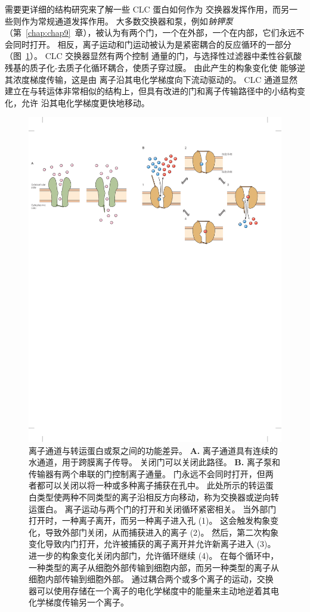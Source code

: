 需要更详细的结构研究来了解一些 CLC 蛋白如何作为  交换器发挥作用，而另一些则作为常规通道发挥作用。
大多数交换器和泵，例如\textit{钠钾泵}（第~\ref{chap:chap9}~章），被认为有两个门，一个在外部，一个在内部，它们永远不会同时打开。
相反，离子运动和门运动被认为是紧密耦合的反应循环的一部分（图~\ref{fig:8_16}）。
CLC 交换器显然有两个控制  通量的门，与选择性过滤器中柔性谷氨酸残基的质子化-去质子化循环耦合，使质子穿过膜。
由此产生的构象变化使  能够逆其浓度梯度传输，这是由  离子沿其电化学梯度向下流动驱动的。
CLC 通道显然建立在与转运体非常相似的结构上，但具有改进的门和离子传输路径中的小结构变化，允许  沿其电化学梯度更快地移动。


\begin{figure}[htbp]
	\centering
	\includegraphics[width=0.85\linewidth]{chap08/fig_8_16}
	\caption{离子通道与转运蛋白或泵之间的功能差异\cite{gadsby2004spot}。 
		\textbf{A.} 离子通道具有连续的水通道，用于跨膜离子传导。
		关闭门可以关闭此路径。
		\textbf{B.} 离子泵和传输器有两个串联的门控制离子通量。
		门永远不会同时打开，但两者都可以关闭以将一种或多种离子捕获在孔中。
		此处所示的转运蛋白类型使两种不同类型的离子沿相反方向移动，称为交换器或逆向转运蛋白。
		离子运动与两个门的打开和关闭循环紧密相关。
		当外部门打开时，一种离子离开，而另一种离子进入孔 (1)。
		这会触发构象变化，导致外部门关闭，从而捕获进入的离子 (2)。
		然后，第二次构象变化导致内门打开，允许被捕获的离子离开并允许新离子进入 (3)。
		进一步的构象变化关闭内部门，允许循环继续 (4)。
		在每个循环中，一种类型的离子从细胞外部传输到细胞内部，而另一种类型的离子从细胞内部传输到细胞外部。
		通过耦合两个或多个离子的运动，交换器可以使用存储在一个离子的电化学梯度中的能量来主动地逆着其电化学梯度传输另一个离子。}
	\label{fig:8_16}
\end{figure}



